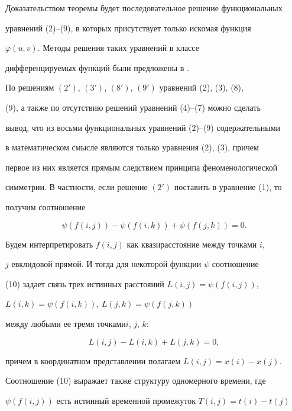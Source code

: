 Доказательством теоремы будет последовательное решение функциональных 


уравнений (2)--(9), в которых присутствует только искомая функция 


$\varphi(u,v)$. Методы решения таких уравнений в классе 


дифференцируемых функций были предложены в \cite{2}. 


 


По решениям $(2')$, $(3')$, $(8')$, $(9')$ уравнений (2), (3), (8), 


(9), а также по отсутствию решений уравнений (4)--(7) можно сделать 


вывод, что из восьми функциональных уравнений (2)--(9) содержательными 


в математическом смысле являются только уравнения (2), (3), причем 


первое из них является прямым следствием принципа феноменологической 


симметрии. В частности, если решение $(2')$ поставить в уравнение (1), то 


получим соотношение 


\begin{equation} 


\psi(f(i,j))-\psi(f(i,k))+\psi(f(j,k))=0. 


\end{equation} 


 


Будем интерпретировать $f(i,j)$ как квазирасстояние между точками $i$, 


$j$ евклидовой прямой. И тогда для некоторой функции $\psi$ соотношение 


(10) задает связь трех истинных расстояний $L(i,j)=\psi(f(i,j))$, 


$L(i,k)=\psi(f(i,k))$, $L(j,k)=\psi(f(j,k))$


между любыми ее тремя точками\linebreak $i$, $j$, $k$: 


$$ 


L(i,j)-L(i,k)+L(j,k)=0,


$$ 


причем в координатном представлении полагаем $L(i,j)=x(i)-x(j)$. 


Соотношение (10) выражает также структуру одномерного времени, где 


$\psi(f(i,j))$ есть истинный временной промежуток $T(i,j)=t(i)-t(j)$ 



